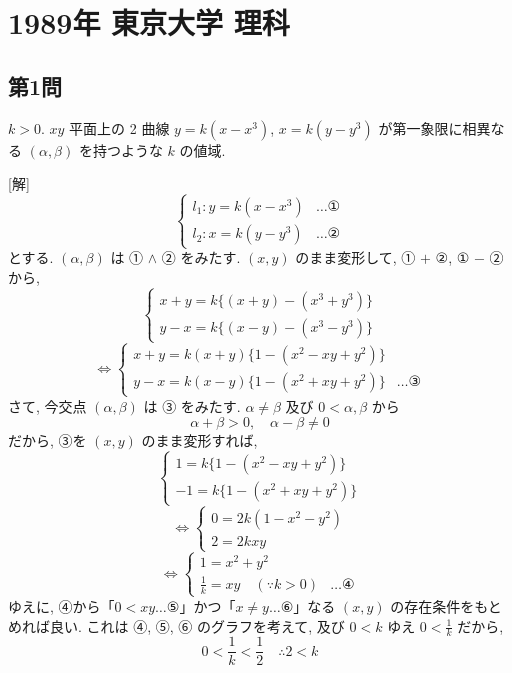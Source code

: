 \documentclass[../main.tex]{subfiles}
\begin{document}
\section*{1989年 東京大学 理科}

\subsection*{第1問}

$k > 0$. $xy$ 平面上の 2 曲線 $y = k(x - x^3)$, $x = k(y - y^3)$ が第一象限に相異なる $(\alpha, \beta)$ を持つような $k$ の値域.

\bigskip

[解]
\[
  \begin{cases}
    l_1 : y = k(x - x^3) & \dots \text{①} \\
    l_2 : x = k(y - y^3) & \dots \text{②}
  \end{cases}
\]
とする. $(\alpha, \beta)$ は ① $\land$ ② をみたす. $(x, y)$ のまま変形して, ① $+$ ②, ① $-$ ② から,
\[
  \begin{cases}
    x + y = k \{(x + y) - (x^3 + y^3)\} \\
    y - x = k \{(x - y) - (x^3 - y^3)\}
  \end{cases}
\]
\[
  \iff
  \begin{cases}
    x + y = k (x + y) \{1 - (x^2 - xy + y^2)\} \\
    y - x = k (x - y) \{1 - (x^2 + xy + y^2)\} & \dots \text{③}
  \end{cases}
\]
さて, 今交点 $(\alpha, \beta)$ は ③ をみたす. $\alpha \neq \beta$ 及び $0 < \alpha, \beta$ から
\[
  \alpha + \beta > 0, \quad \alpha - \beta \neq 0
\]
だから, ③を $(x, y)$ のまま変形すれば,
\[
  \begin{cases}
    1 = k \{1 - (x^2 - xy + y^2)\} \\
    -1 = k \{1 - (x^2 + xy + y^2)\}
  \end{cases}
\]
\[
  \iff
  \begin{cases}
    0 = 2k (1 - x^2 - y^2) \\
    2 = 2k xy
  \end{cases}
\]
\[
  \iff
  \begin{cases}
    1 = x^2 + y^2 \\
    \frac{1}{k} = xy \quad (\because k > 0) & \dots \text{④}
  \end{cases}
\]
ゆえに, ④から「$0 < xy \dots \text{⑤}$」かつ「$x \neq y \dots \text{⑥}$」なる $(x, y)$ の存在条件をもとめれば良い. これは ④, ⑤, ⑥ のグラフを考えて, 及び $0 < k$ ゆえ $0 < \frac{1}{k}$ だから,
\[
  0 < \frac{1}{k} < \frac{1}{2} \quad \therefore 2 < k
\]
\end{document}
